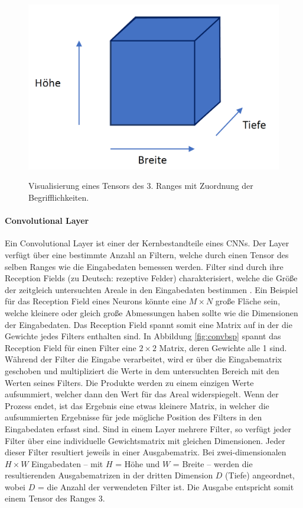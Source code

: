 \begin{figure}[H]
\centering
\includegraphics[scale=0.4]{pictures/grafiken/bht-erlk}
\label{fig:bth}
\caption{Visualisierung eines Tensors des 3. Ranges mit Zuordnung der Begrifflichkeiten.}
\end{figure}

\paragraph{Convolutional Layer}

Ein Convolutional Layer ist einer der Kernbestandteile eines CNNs. Der Layer verfügt über eine bestimmte Anzahl an Filtern, welche durch einen Tensor des selben Ranges wie die Eingabedaten bemessen werden. Filter sind durch ihre Reception Fields (zu Deutsch: rezeptive Felder) charakterisiert, welche die Größe der zeitgleich untersuchten Areale in den Eingabedaten bestimmen \parencite{DBLP:journals/corr/OSheaN15}. Ein Beispiel für das Reception Field eines Neurons könnte eine $M \times N$ große Fläche sein, welche kleinere oder gleich große Abmessungen haben sollte wie die Dimensionen der Eingabedaten. Das Reception Field spannt somit eine Matrix auf in der die Gewichte jedes Filters enthalten sind. In Abbildung \ref{fig:convbsp} spannt das Reception Field für einen Filter eine $2 \times 2$ Matrix, deren Gewichte alle 1 sind. Während der Filter die Eingabe verarbeitet, wird er über die Eingabematrix geschoben und multipliziert die Werte in dem untersuchten Bereich mit den Werten seines Filters. Die Produkte werden zu einem einzigen Werte aufsummiert, welcher dann den Wert für das Areal widerspiegelt. Wenn der Prozess endet, ist das Ergebnis eine etwas kleinere Matrix, in welcher die aufsummierten Ergebnisse für jede mögliche Position des Filters in den Eingabedaten erfasst sind. Sind in einem Layer mehrere Filter, so verfügt jeder Filter über eine individuelle Gewichtsmatrix mit gleichen Dimensionen. Jeder dieser Filter resultiert jeweils in einer Ausgabematrix. Bei zwei-dimensionalen $H \times W$ Eingabedaten -- mit $H$ = Höhe und $W$ = Breite -- werden die resultierenden Ausgabematrizen in der dritten Dimension $D$ (Tiefe) angeordnet, wobei $D$ = die Anzahl der verwendeten Filter ist. Die Ausgabe entspricht somit einem Tensor des Ranges 3.  

